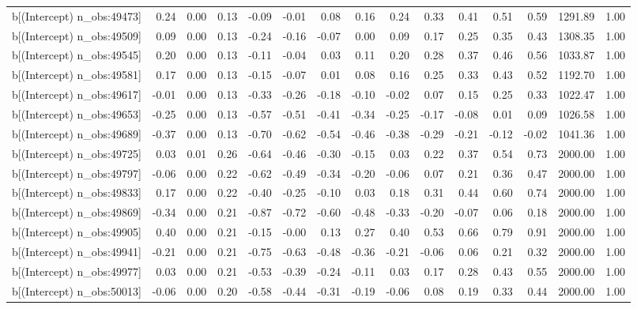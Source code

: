 \begin{table}[ht]
\begin{tabular}{rrrrrrrrrrrrrrr}
  b[(Intercept) n\_obs:49473] & 0.24 & 0.00 & 0.13 & -0.09 & -0.01 & 0.08 & 0.16 & 0.24 & 0.33 & 0.41 & 0.51 & 0.59 & 1291.89 & 1.00 \\ 
  b[(Intercept) n\_obs:49509] & 0.09 & 0.00 & 0.13 & -0.24 & -0.16 & -0.07 & 0.00 & 0.09 & 0.17 & 0.25 & 0.35 & 0.43 & 1308.35 & 1.00 \\ 
  b[(Intercept) n\_obs:49545] & 0.20 & 0.00 & 0.13 & -0.11 & -0.04 & 0.03 & 0.11 & 0.20 & 0.28 & 0.37 & 0.46 & 0.56 & 1033.87 & 1.00 \\ 
  b[(Intercept) n\_obs:49581] & 0.17 & 0.00 & 0.13 & -0.15 & -0.07 & 0.01 & 0.08 & 0.16 & 0.25 & 0.33 & 0.43 & 0.52 & 1192.70 & 1.00 \\ 
  b[(Intercept) n\_obs:49617] & -0.01 & 0.00 & 0.13 & -0.33 & -0.26 & -0.18 & -0.10 & -0.02 & 0.07 & 0.15 & 0.25 & 0.33 & 1022.47 & 1.00 \\ 
  b[(Intercept) n\_obs:49653] & -0.25 & 0.00 & 0.13 & -0.57 & -0.51 & -0.41 & -0.34 & -0.25 & -0.17 & -0.08 & 0.01 & 0.09 & 1026.58 & 1.00 \\ 
  b[(Intercept) n\_obs:49689] & -0.37 & 0.00 & 0.13 & -0.70 & -0.62 & -0.54 & -0.46 & -0.38 & -0.29 & -0.21 & -0.12 & -0.02 & 1041.36 & 1.00 \\ 
  b[(Intercept) n\_obs:49725] & 0.03 & 0.01 & 0.26 & -0.64 & -0.46 & -0.30 & -0.15 & 0.03 & 0.22 & 0.37 & 0.54 & 0.73 & 2000.00 & 1.00 \\ 
  b[(Intercept) n\_obs:49797] & -0.06 & 0.00 & 0.22 & -0.62 & -0.49 & -0.34 & -0.20 & -0.06 & 0.07 & 0.21 & 0.36 & 0.47 & 2000.00 & 1.00 \\ 
  b[(Intercept) n\_obs:49833] & 0.17 & 0.00 & 0.22 & -0.40 & -0.25 & -0.10 & 0.03 & 0.18 & 0.31 & 0.44 & 0.60 & 0.74 & 2000.00 & 1.00 \\ 
  b[(Intercept) n\_obs:49869] & -0.34 & 0.00 & 0.21 & -0.87 & -0.72 & -0.60 & -0.48 & -0.33 & -0.20 & -0.07 & 0.06 & 0.18 & 2000.00 & 1.00 \\ 
  b[(Intercept) n\_obs:49905] & 0.40 & 0.00 & 0.21 & -0.15 & -0.00 & 0.13 & 0.27 & 0.40 & 0.53 & 0.66 & 0.79 & 0.91 & 2000.00 & 1.00 \\ 
  b[(Intercept) n\_obs:49941] & -0.21 & 0.00 & 0.21 & -0.75 & -0.63 & -0.48 & -0.36 & -0.21 & -0.06 & 0.06 & 0.21 & 0.32 & 2000.00 & 1.00 \\ 
  b[(Intercept) n\_obs:49977] & 0.03 & 0.00 & 0.21 & -0.53 & -0.39 & -0.24 & -0.11 & 0.03 & 0.17 & 0.28 & 0.43 & 0.55 & 2000.00 & 1.00 \\ 
  b[(Intercept) n\_obs:50013] & -0.06 & 0.00 & 0.20 & -0.58 & -0.44 & -0.31 & -0.19 & -0.06 & 0.08 & 0.19 & 0.33 & 0.44 & 2000.00 & 1.00 \\ 

\end{tabular}
\end{table}
